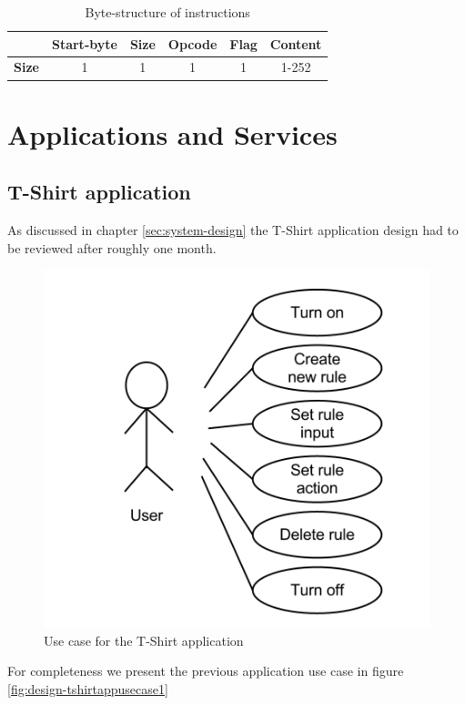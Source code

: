 \begin{table}
\begin{tabular}{c|c|c|c|c|c|}
\cline{2-6}
& \textbf{Start-byte} & \textbf{Size} & \textbf{Opcode} & \textbf{Flag} & \textbf{Content} \\
\hline
\multicolumn{1}{|c|}{\textbf{Size}} & 1 & 1 & 1 & 1 & 1-252 \\
\hline
\end{tabular}
\caption{Byte-structure of instructions}
\label{tbl:instr_struct}
\end{table}


\section{Applications and Services}

\subsection{T-Shirt application}

As discussed in chapter \ref{sec:system-design} the T-Shirt application design had to be reviewed after roughly one month.

\begin{figure}[h!]
\centering \includegraphics[scale=0.35]{img/design-tshirtappusecase2}
\caption{Use case for the T-Shirt application}
\label{fig:design-tshirtappusecase2}
\end{figure}

For completeness we present the previous application use case in figure \ref{fig:design-tshirtappusecase1}

